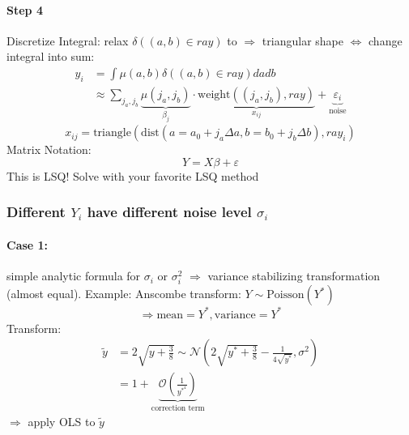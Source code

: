 \documentclass[11pt]{article}
\begin{document}
      \paragraph{Step 4} Discretize Integral: relax $\delta((a,b) \in ray)$ to
      $\Rightarrow$ triangular shape $\iff$ change integral into sum:
      \begin{equation*}
        \begin{align*}
        y_i &= \int \mu(a,b) \delta((a,b) \in ray) da db \\
        &\approx \sum_{j_a, j_b} \underbrace{\mu(j_a, j_b)}_{\beta_j} \cdot
        \underbrace{\text{weight}((j_a, j_b), ray)}_{x_{ij}} +
        \underbrace{\varepsilon_i}_{\text{noise}}
        \end{align*}
      \end{equation*}
      \begin{equation*}
        x_{ij} = \text{triangle} (\text{dist}(a=a_0+j_a \Delta a, b= b_0+j_b \Delta b), ray_i)
      \end{equation*}
      Matrix Notation:
      \begin{equation*}
        Y = X\beta + \varepsilon
      \end{equation*}
      This is LSQ! Solve with your favorite LSQ method
      \subsubsection{Different $Y_i$ have different noise level $\sigma_i$}
      \paragraph{Case 1:} simple analytic formula for $\sigma_i$ or $\sigma_i^2$
      $\Rightarrow$ variance stabilizing transformation (almost equal).
      Example: Anscombe transform: $Y \sim \text{Poisson}(Y^*)$
      \begin{equation*}
        \Rightarrow \text{mean} = Y^*, \text{variance} = Y^*
      \end{equation*}
      Transform:
      \begin{equation*}
        \begin{align*}
        \tilde{y} &= 2\sqrt{y+\frac{3}{8}} \sim \mathcal{N}(2
        \sqrt{y^*+\frac{3}{8}}-\frac{1}{4\sqrt{y^*}}, \sigma^2) \\
        &=1+\underbrace{\mathcal{O}\left(\frac{1}{y^*^4}\right)}_{\text{correction term}}
        \end{align*}
      \end{equation*}
      $\Rightarrow$ apply OLS to $\tilde{y}$ \\
\end{document}
